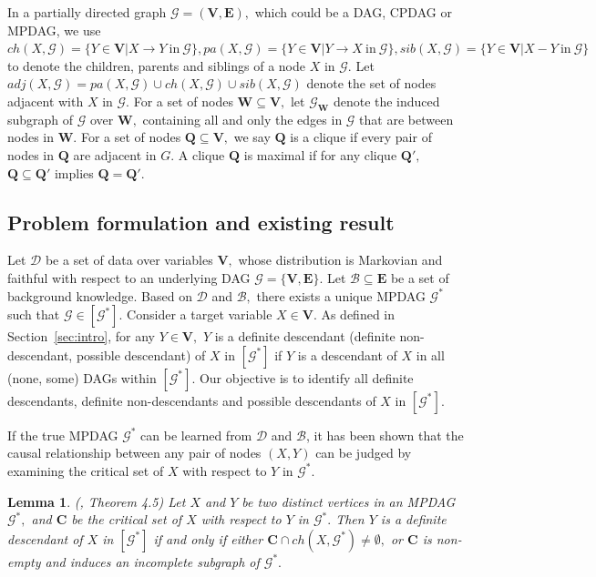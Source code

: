 \documentclass{article}
\newtheorem{lemma}{Lemma}
\begin{document}
In a partially directed graph $\mathcal{G}=(\mathbf{V},\mathbf{E}),$ which could be a DAG, CPDAG or MPDAG, we use $ch(X,\mathcal{G})=\{Y\in \mathbf{V}|X\to Y\mathrm{\ in\ }\mathcal{G}\},pa(X,\mathcal{G})=\{Y\in\mathbf{V}|Y\to X\mathrm{\ in\ }\mathcal{G}\},sib(X,\mathcal{G})=\{Y\in\mathbf{V}|X- Y\mathrm{\ in\ }\mathcal{G}\}$ to denote the children, parents and siblings of a node $X$ in $\mathcal{G}.$
Let $adj(X,\mathcal{G})=pa(X,\mathcal{G})\cup ch(X,\mathcal{G})\cup sib(X,\mathcal{G})$ denote the set of nodes adjacent with $X$ in $\mathcal{G}.$
For a set of nodes $\mathbf{W}\subseteq \mathbf{V},$ let $\mathcal{G}_\mathbf{W}$ denote the induced subgraph of $\mathcal{G}$ over $\mathbf{W},$ containing all and only the edges in $\mathcal{G}$ that are between nodes in $\mathbf{W}.$
For a set of nodes $\mathbf{Q}\subseteq \mathbf{V},$ we say $\mathbf{Q}$ is a clique if every pair of nodes in $\mathbf{Q}$ are adjacent in $G.$ A clique $\mathbf{Q}$ is maximal if for any clique $\mathbf{Q}',$ $\mathbf{Q}\subseteq \mathbf{Q}'$ implies $\mathbf{Q}=\mathbf{Q}'.$

\subsection{Problem formulation and existing result}

Let $\mathcal{D}$ be a set of data over variables $\mathbf{V},$ whose distribution is Markovian and faithful with respect to an underlying DAG $\mathcal{G}=\{\mathbf{V},\mathbf{E}\}.$
Let $\mathcal{B}\subseteq \mathbf{E}$ be a set of background knowledge.
Based on $\mathcal{D}$ and $\mathcal{B},$ there exists a unique MPDAG $\mathcal{G}^*$ such that $\mathcal{G}\in \left[\mathcal{G}^*\right].$
Consider a target variable $X\in\mathbf{V}$.
As defined in Section~\ref{sec:intro}, for any $Y\in\mathbf{V},$ $Y$ is a definite descendant (definite non-descendant, possible descendant) of $X$ in $\left[\mathcal{G}^*\right]$ if $Y$ is a descendant of $X$ in all (none, some) DAGs within $\left[\mathcal{G}^*\right].$
Our objective is to identify all definite descendants, definite non-descendants and possible descendants of $X$ in $\left[\mathcal{G}^*\right].$

If the true MPDAG $\mathcal{G}^*$ can be learned from $\mathcal{D}$ and $\mathcal{B}$, it has been shown that the causal relationship between any pair of nodes $(X,Y)$ can be judged by examining the critical set of $X$ with respect to $Y$ in $\mathcal{G}^*.$

\begin{lemma}
\label{lemma:zuo}
(\citep{zuo2022counterfactual}, Theorem 4.5) Let $X$ and $Y$ be two distinct vertices in an MPDAG $\mathcal{G}^*,$ and $\mathbf{C}$ be the critical set of $X$ with respect to $Y$ in $\mathcal{G}^*.$
Then $Y$ is a definite descendant of $X$ in $\left[\mathcal{G}^*\right]$ if and only if either $\mathbf{C}\cap ch(X,\mathcal{G}^*) \neq \emptyset,$ or $\mathbf{C}$ is non-empty and induces an incomplete subgraph of $\mathcal{G}^*.$
\end{lemma}
\end{document}

